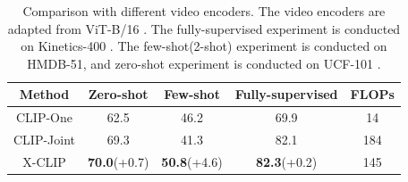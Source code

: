 \begin{table}[tb!]
\vspace{-.2cm}
\centering
\caption{Comparison with different video encoders. The video encoders are adapted from ViT-B/16 \cite{clip}. The fully-supervised experiment is conducted on Kinetics-400 \cite{k400}. The few-shot(2-shot) experiment is conducted on HMDB-51, and zero-shot experiment is conducted on UCF-101 \cite{soomro2012ucf101}.}
\centering
  \begin{tabular}{c|ccc|c}
  \toprule
  Method & Zero-shot & Few-shot & Fully-supervised & FLOPs\\
  \midrule
  CLIP-One & 62.5 & 46.2 & 69.9 & 14\\
  CLIP-Joint & 69.3 & 41.3 & 82.1 & 184 \\
  \midrule
  X-CLIP & \textbf{70.0}\scriptsize(+0.7) & \textbf{50.8}\scriptsize(+4.6) & \textbf{82.3}\scriptsize(+0.2) & 145 \\
  \bottomrule
  \end{tabular}
\label{tab:joint_mean}
\end{table}